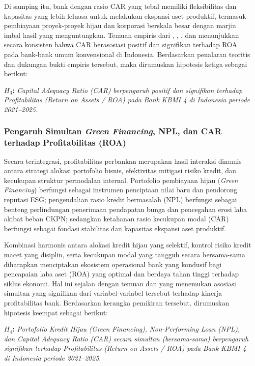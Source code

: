 \documentclass[12pt,a4paper]{article}
\numberwithin{equation}{section}
\begin{document}
\noindent
Di samping itu, bank dengan rasio CAR yang tebal memiliki fleksibilitas dan kapasitas yang lebih leluasa untuk melakukan ekspansi aset produktif, termasuk pembiayaan proyek-proyek hijau dan korporasi berskala besar dengan marjin imbal hasil yang menguntungkan. Temuan empiris dari \citet{LestariPurnomo2023}, \citet{NugrohoUtami2021}, \citet{Pramono2022}, dan \citet{HaryantoSudarno2023} menunjukkan secara konsisten bahwa CAR berasosiasi positif dan signifikan terhadap ROA pada bank-bank umum konvensional di Indonesia. Berdasarkan penalaran teoritis dan dukungan bukti empiris tersebut, maka dirumuskan hipotesis ketiga sebagai berikut:

\vspace{0.2cm}
\noindent \textbf{$H_3$:} \emph{Capital Adequacy Ratio (CAR) berpengaruh positif dan signifikan terhadap Profitabilitas (Return on Assets / ROA) pada Bank KBMI 4 di Indonesia periode 2021--2025.}

\subsubsection{Pengaruh Simultan \emph{Green Financing}, NPL, dan CAR terhadap Profitabilitas (ROA)}
\noindent
Secara terintegrasi, profitabilitas perbankan merupakan hasil interaksi dinamis antara strategi alokasi portofolio bisnis, efektivitas mitigasi risiko kredit, dan kecukupan struktur permodalan internal. Portofolio pembiayaan hijau (\emph{Green Financing}) berfungsi sebagai instrumen penciptaan nilai baru dan pendorong reputasi ESG; pengendalian rasio kredit bermasalah (NPL) berfungsi sebagai benteng perlindungan penerimaan pendapatan bunga dan pencegahan erosi laba akibat beban CKPN; sedangkan ketahanan rasio kecukupan modal (CAR) berfungsi sebagai fondasi stabilitas dan kapasitas ekspansi aset produktif.

\noindent
Kombinasi harmonis antara alokasi kredit hijau yang selektif, kontrol risiko kredit macet yang disiplin, serta kecukupan modal yang tangguh secara bersama-sama diharapkan menciptakan ekosistem operasional bank yang kondusif bagi pencapaian laba aset (ROA) yang optimal dan berdaya tahan tinggi terhadap siklus ekonomi. Hal ini sejalan dengan temuan \citet{Pramono2022} dan \citet{WulandariRahardjo2022} yang menemukan asosiasi simultan yang signifikan dari variabel-variabel tersebut terhadap kinerja profitabilitas bank. Berdasarkan kerangka pemikiran tersebut, dirumuskan hipotesis keempat sebagai berikut:

\vspace{0.2cm}
\noindent \textbf{$H_4$:} \emph{Portofolio Kredit Hijau (Green Financing), Non-Performing Loan (NPL), dan Capital Adequacy Ratio (CAR) secara simultan (bersama-sama) berpengaruh signifikan terhadap Profitabilitas (Return on Assets / ROA) pada Bank KBMI 4 di Indonesia periode 2021--2025.}
\end{document}
